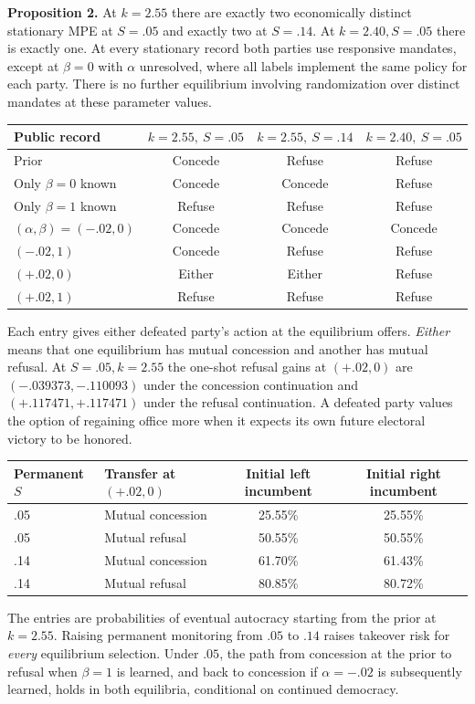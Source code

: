 \documentclass[11pt,letterpaper]{article}
\begin{document}
\textbf{Proposition 2.} At $k=2.55$ there are exactly two economically distinct stationary MPE at $S=.05$ and exactly two at $S=.14$. At $k=2.40,S=.05$ there is exactly one. At every stationary record both parties use responsive mandates, except at $\beta=0$ with $\alpha$ unresolved, where all labels implement the same policy for each party. There is no further equilibrium involving randomization over distinct mandates at these parameter values.

\begin{center}\small
\begin{tabular}{@{}lccc@{}}
\toprule
Public record & $k=2.55,\ S=.05$ & $k=2.55,\ S=.14$ & $k=2.40,\ S=.05$\\
\midrule
Prior & Concede & Refuse & Refuse\\
Only $\beta=0$ known & Concede & Concede & Refuse\\
Only $\beta=1$ known & Refuse & Refuse & Refuse\\
$(\alpha,\beta)=(-.02,0)$ & Concede & Concede & Concede\\
$(-.02,1)$ & Concede & Refuse & Refuse\\
$(+.02,0)$ & Either & Either & Refuse\\
$(+.02,1)$ & Refuse & Refuse & Refuse\\
\bottomrule
\end{tabular}
\end{center}
Each entry gives either defeated party's action at the equilibrium offers. \emph{Either} means that one equilibrium has mutual concession and another has mutual refusal. At $S=.05,k=2.55$ the one-shot refusal gains at $(+.02,0)$ are $(-.039373,-.110093)$ under the concession continuation and $(+.117471,+.117471)$ under the refusal continuation. A defeated party values the option of regaining office more when it expects its own future electoral victory to be honored.

\begin{center}\small
\begin{tabular}{@{}llcc@{}}
\toprule
Permanent $S$ & Transfer at $(+.02,0)$ & Initial left incumbent & Initial right incumbent\\
\midrule
.05 & Mutual concession & 25.55\% & 25.55\%\\
.05 & Mutual refusal & 50.55\% & 50.55\%\\
.14 & Mutual concession & 61.70\% & 61.43\%\\
.14 & Mutual refusal & 80.85\% & 80.72\%\\
\bottomrule
\end{tabular}
\end{center}
The entries are probabilities of eventual autocracy starting from the prior at $k=2.55$. Raising permanent monitoring from $.05$ to $.14$ raises takeover risk for \emph{every} equilibrium selection. Under $.05$, the path from concession at the prior to refusal when $\beta=1$ is learned, and back to concession if $\alpha=-.02$ is subsequently learned, holds in both equilibria, conditional on continued democracy.
\end{document}
